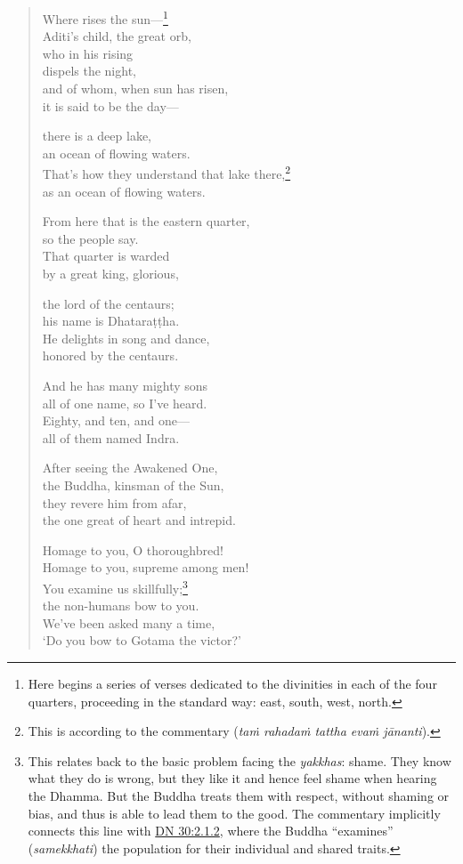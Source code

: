 \documentclass[12pt,openany]{book}%
\begin{document}
\begin{verse}
Where rises the sun—\footnote{Here begins a series of verses dedicated to the divinities in each of the four quarters, proceeding in the standard way: east, south, west, north. } \\
Aditi’s child, the great orb, \\
who in his rising \\
dispels the night, \\
and of whom, when sun has risen, \\
it is said to be the day—

there is a deep lake, \\
an ocean of flowing waters. \\
That’s how they understand that lake there,\footnote{This is according to the commentary (\textit{\textsanskrit{taṁ} \textsanskrit{rahadaṁ} tattha \textsanskrit{evaṁ} \textsanskrit{jānanti}}). } \\
as an ocean of flowing waters. 

From here that is the eastern quarter, \\
so the people say. \\
That quarter is warded \\
by a great king, glorious, 

the lord of the centaurs; \\
his name is \textsanskrit{Dhataraṭṭha}. \\
He delights in song and dance, \\
honored by the centaurs. 

And he has many mighty sons \\
all of one name, so I’ve heard. \\
Eighty, and ten, and one—\\
all of them named Indra. 

After seeing the Awakened One, \\
the Buddha, kinsman of the Sun, \\
they revere him from afar, \\
the one great of heart and intrepid. 

Homage to you, O thoroughbred! \\
Homage to you, supreme among men! \\
You examine us skillfully;\footnote{This relates back to the basic problem facing the \textit{yakkhas}: shame. They know what they do is wrong, but they like it and hence feel shame when hearing the Dhamma. But the Buddha treats them with respect, without shaming or bias, and thus is able to lead them to the good. The commentary implicitly connects this line with \href{https://suttacentral.net/dn30/en/sujato\#2.1.2}{DN 30:2.1.2}, where the Buddha “examines” (\textit{samekkhati}) the population for their individual and shared traits. } \\
the non-humans bow to you. \\
We’ve been asked many a time, \\
‘Do you bow to Gotama the victor?’ 


\end{verse}
\end{document}
